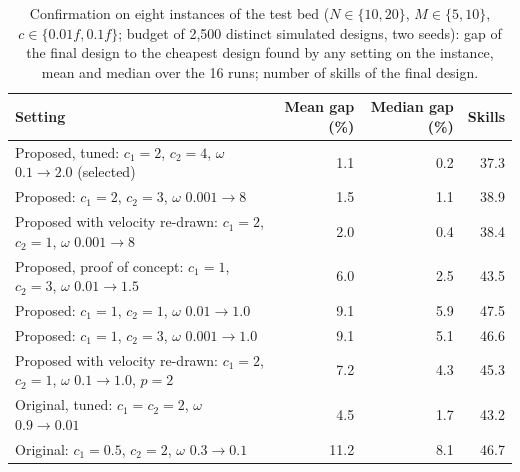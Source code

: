 \begin{table}[ht!]
\centering
\caption{Confirmation on eight instances of the test bed ($N\in\{10,20\}$, $M\in\{5,10\}$, $c\in\{0.01f,0.1f\}$; budget of 2,500 distinct simulated designs, two seeds): gap of the final design to the cheapest design found by any setting on the instance, mean and median over the 16 runs; number of skills of the final design.}
\label{tab:tunig_results_max}
\small
\begin{tabular}{@{}lrrr@{}}
\toprule
Setting & Mean gap (\%) & Median gap (\%) & Skills \\
\midrule
Proposed, tuned: $c_1=2$, $c_2=4$, $\omega$ $0.1\to2.0$ (selected) & 1.1 & 0.2 & 37.3 \\
Proposed: $c_1=2$, $c_2=3$, $\omega$ $0.001\to8$ & 1.5 & 1.1 & 38.9 \\
Proposed with velocity re-drawn: $c_1=2$, $c_2=1$, $\omega$ $0.001\to8$ & 2.0 & 0.4 & 38.4 \\
Proposed, proof of concept: $c_1=1$, $c_2=3$, $\omega$ $0.01\to1.5$ & 6.0 & 2.5 & 43.5 \\
Proposed: $c_1=1$, $c_2=1$, $\omega$ $0.01\to1.0$ & 9.1 & 5.9 & 47.5 \\
Proposed: $c_1=1$, $c_2=3$, $\omega$ $0.001\to1.0$ & 9.1 & 5.1 & 46.6 \\
Proposed with velocity re-drawn: $c_1=2$, $c_2=1$, $\omega$ $0.1\to1.0$, $p=2$ & 7.2 & 4.3 & 45.3 \\
Original, tuned: $c_1=c_2=2$, $\omega$ $0.9\to0.01$ & 4.5 & 1.7 & 43.2 \\
Original: $c_1=0.5$, $c_2=2$, $\omega$ $0.3\to0.1$ & 11.2 & 8.1 & 46.7 \\
\bottomrule
\end{tabular}
\end{table}
